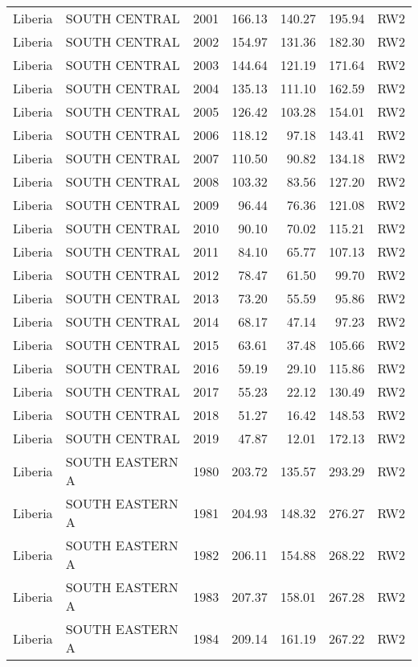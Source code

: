 \begin{longtable}{lllrrrl}
  Liberia & SOUTH CENTRAL & 2001 & 166.13 & 140.27 & 195.94 & RW2 \\ 
  Liberia & SOUTH CENTRAL & 2002 & 154.97 & 131.36 & 182.30 & RW2 \\ 
  Liberia & SOUTH CENTRAL & 2003 & 144.64 & 121.19 & 171.64 & RW2 \\ 
  Liberia & SOUTH CENTRAL & 2004 & 135.13 & 111.10 & 162.59 & RW2 \\ 
  Liberia & SOUTH CENTRAL & 2005 & 126.42 & 103.28 & 154.01 & RW2 \\ 
  Liberia & SOUTH CENTRAL & 2006 & 118.12 & 97.18 & 143.41 & RW2 \\ 
  Liberia & SOUTH CENTRAL & 2007 & 110.50 & 90.82 & 134.18 & RW2 \\ 
  Liberia & SOUTH CENTRAL & 2008 & 103.32 & 83.56 & 127.20 & RW2 \\ 
  Liberia & SOUTH CENTRAL & 2009 & 96.44 & 76.36 & 121.08 & RW2 \\ 
  Liberia & SOUTH CENTRAL & 2010 & 90.10 & 70.02 & 115.21 & RW2 \\ 
  Liberia & SOUTH CENTRAL & 2011 & 84.10 & 65.77 & 107.13 & RW2 \\ 
  Liberia & SOUTH CENTRAL & 2012 & 78.47 & 61.50 & 99.70 & RW2 \\ 
  Liberia & SOUTH CENTRAL & 2013 & 73.20 & 55.59 & 95.86 & RW2 \\ 
  Liberia & SOUTH CENTRAL & 2014 & 68.17 & 47.14 & 97.23 & RW2 \\ 
  Liberia & SOUTH CENTRAL & 2015 & 63.61 & 37.48 & 105.66 & RW2 \\ 
  Liberia & SOUTH CENTRAL & 2016 & 59.19 & 29.10 & 115.86 & RW2 \\ 
  Liberia & SOUTH CENTRAL & 2017 & 55.23 & 22.12 & 130.49 & RW2 \\ 
  Liberia & SOUTH CENTRAL & 2018 & 51.27 & 16.42 & 148.53 & RW2 \\ 
  Liberia & SOUTH CENTRAL & 2019 & 47.87 & 12.01 & 172.13 & RW2 \\ 
  Liberia & SOUTH EASTERN A & 1980 & 203.72 & 135.57 & 293.29 & RW2 \\ 
  Liberia & SOUTH EASTERN A & 1981 & 204.93 & 148.32 & 276.27 & RW2 \\ 
  Liberia & SOUTH EASTERN A & 1982 & 206.11 & 154.88 & 268.22 & RW2 \\ 
  Liberia & SOUTH EASTERN A & 1983 & 207.37 & 158.01 & 267.28 & RW2 \\ 
  Liberia & SOUTH EASTERN A & 1984 & 209.14 & 161.19 & 267.22 & RW2 \\ 

\end{longtable}
